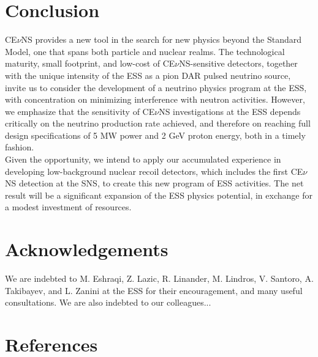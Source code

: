 \documentclass[12pt]{article}
\begin{document}
\newpage

\section{Conclusion}

CE$\nu$NS provides a new tool in the search for new physics beyond the Standard Model, one that spans both particle and nuclear realms. The technological maturity, small footprint, and low-cost of CE$\nu$NS-sensitive detectors, together with the unique intensity of the ESS as a pion DAR pulsed neutrino source, invite us to consider the development of a neutrino physics program at the ESS, with concentration on minimizing interference with neutron activities. However, we emphasize that the sensitivity of CE$\nu$NS investigations at the ESS depends critically on the neutrino production rate achieved, and therefore on reaching full design specifications of 5 MW power and 2 GeV proton energy, both in a timely fashion.\\

Given the opportunity, we intend to apply our accumulated experience in developing low-background nuclear recoil detectors, which includes the first CE$\nu$NS detection at the SNS, to create this new program of ESS activities. The net result will be a significant expansion of the ESS physics potential, in exchange for a modest investment of resources. 

\section{Acknowledgements}

We are indebted to M. Eshraqi, Z. Lazic, R. Linander, M. Lindros, V. Santoro, A. Takibayev, and L. Zanini at the ESS for their encouragement, and many useful consultations. We are also indebted to our colleagues...


\newpage
\section{References}



\end{document}
